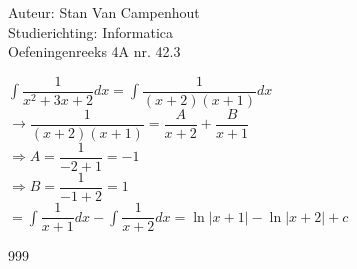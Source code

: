 \documentclass[a4paper]{article}
\begin{document}
  
\noindent \large Auteur: Stan Van Campenhout \\
\noindent \large Studierichting:  Informatica\\
\noindent \large Oefeningenreeks 4A nr. 42.3\\

\medskip

\normalsize

$ \displaystyle\int\dfrac{1}{x^2 +3x + 2}dx = \displaystyle\int\dfrac{1}{\left(x+2\right)\left(x+1\right)}dx $\\

$ \rightarrow \dfrac{1}{\left(x+2\right)\left(x+1\right)} = \dfrac{A}{x+2} + \dfrac{B}{x+1} $\\

$ \Rightarrow A = \dfrac{1}{-2+1} = -1 $\\

$ \Rightarrow B = \dfrac{1}{-1+2} = 1 $\\

$ = \displaystyle\int\dfrac{1}{x+1}dx - \displaystyle\int\dfrac{1}{x+2}dx = \ln|x+1| - \ln|x+2| +c $\\

\begin{thebibliography}{999}
\end{thebibliography}
\end{document}
